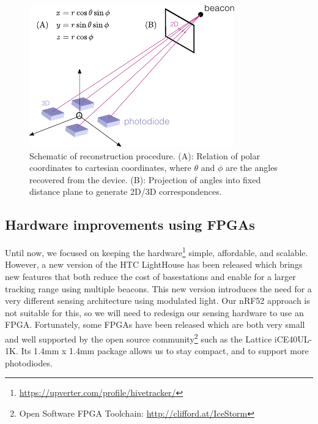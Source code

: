 \documentclass[sigchi]{acmart}
\begin{document}
\begin{figure}[h]
\centering
\includegraphics[width=1.0\columnwidth]{Figures/reconstruction.pdf}
\caption{Schematic of reconstruction procedure. (A): Relation of polar coordinates to cartesian coordinates, where $\theta$ and $\phi$ are the angles recovered from the device. (B): Projection of angles into fixed distance plane to generate 2D/3D correspondences.}
\label{Fig:Reconstruction}
\end{figure}


\subsection{Hardware improvements using FPGAs}

Until now, we focused on keeping the hardware\footnote{\url{https://upverter.com/profile/hivetracker/}} simple, affordable, and scalable. However, a new version of the HTC LightHouse has been released which brings new features that both reduce the cost of basestations and enable for a larger tracking range using multiple beacons. This new version introduces the need for a very different sensing architecture using modulated light. Our nRF52 approach is not suitable for this, so we will need to redesign our sensing hardware to use an FPGA. Fortunately, some FPGAs have been released which are both very small and well supported by the open source community\footnote{Open Software FPGA Toolchain: \url{http://clifford.at/IceStorm}} such as the Lattice iCE40UL-1K. Its 1.4mm x 1.4mm package allows us to stay compact, and to support more photodiodes.


\end{document}
